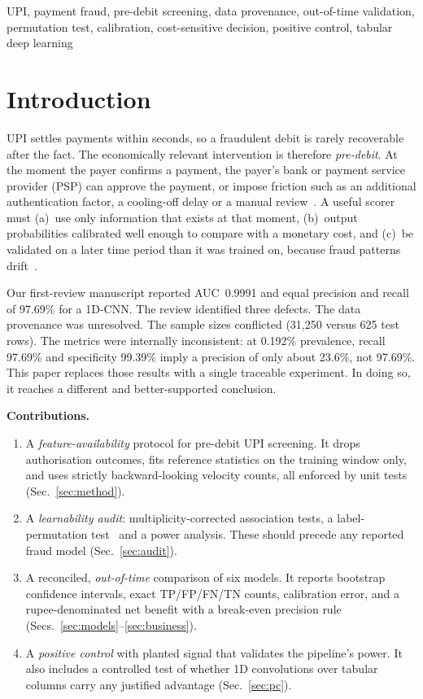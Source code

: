 \documentclass[conference]{IEEEtran}
\begin{document}
\begin{IEEEkeywords}
UPI, payment fraud, pre-debit screening, data provenance, out-of-time validation, permutation test, calibration, cost-sensitive decision, positive control, tabular deep learning
\end{IEEEkeywords}

\section{Introduction}
UPI settles payments within seconds, so a fraudulent debit is rarely recoverable after the fact. The economically relevant intervention is therefore \emph{pre-debit}. At the moment the payer confirms a payment, the payer's bank or payment service provider (PSP) can approve the payment, or impose friction such as an additional authentication factor, a cooling-off delay or a manual review~\cite{rbi2024,npci2024}. A useful scorer must (a)~use only information that exists at that moment, (b)~output probabilities calibrated well enough to compare with a monetary cost, and (c)~be validated on a later time period than it was trained on, because fraud patterns drift~\cite{dalpozzolo2018}.

Our first-review manuscript reported AUC~0.9991 and equal precision and recall of 97.69\% for a 1D-CNN. The review identified three defects. The data provenance was unresolved. The sample sizes conflicted (31,250 versus 625 test rows). The metrics were internally inconsistent: at 0.192\% prevalence, recall 97.69\% and specificity 99.39\% imply a precision of only about 23.6\%, not 97.69\%. This paper replaces those results with a single traceable experiment. In doing so, it reaches a different and better-supported conclusion.

\textbf{Contributions.}
\begin{enumerate}
\item A \emph{feature-availability} protocol for pre-debit UPI screening. It drops authorisation outcomes, fits reference statistics on the training window only, and uses strictly backward-looking velocity counts, all enforced by unit tests (Sec.~\ref{sec:method}).
\item A \emph{learnability audit}: multiplicity-corrected association tests, a label-permutation test~\cite{ojala2010} and a power analysis. These should precede any reported fraud model (Sec.~\ref{sec:audit}).
\item A reconciled, \emph{out-of-time} comparison of six models. It reports bootstrap confidence intervals, exact TP/FP/FN/TN counts, calibration error, and a rupee-denominated net benefit with a break-even precision rule (Secs.~\ref{sec:models}--\ref{sec:business}).
\item A \emph{positive control} with planted signal that validates the pipeline's power. It also includes a controlled test of whether 1D convolutions over tabular columns carry any justified advantage (Sec.~\ref{sec:pc}).
\end{enumerate}
\end{document}
